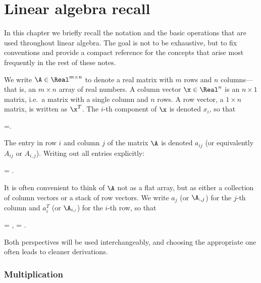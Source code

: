 
\chapter{Linear algebra recall}

In this chapter we briefly recall the notation and the basic operations that are used throughout linear algebra. The goal is not to be exhaustive, but to fix conventions and provide a compact reference for the concepts that arise most frequently in the rest of these notes.

We write $\A\in\Real^{m\times n}$ to denote a real matrix with $m$ rows and $n$ columns---that is, an $m\times n$ array of real numbers. A column vector $\x\in\Real^n$ is an $n\times 1$ matrix, i.e.\ a matrix with a single column and $n$ rows. A row vector, a $1\times n$ matrix, is written as $\x^T$. The $i$-th component of $\x$ is denoted $x_i$, so that
\begin{myequation}
\x=.
\end{myequation}
The entry in row $i$ and column $j$ of the matrix $\A$ is denoted $a_{ij}$ (or equivalently $A_{ij}$ or $A_{i,j}$). Writing out all entries explicitly:
\begin{myequation}
\A=
 .
\end{myequation}
It is often convenient to think of $\A$ not as a flat array, but as either a collection of column vectors or a stack of row vectors. We write $a_j$ (or $\A_{:,j}$) for the $j$-th column and $a_i^T$ (or $\A_{i,:}$) for the $i$-th row, so that
\begin{myequation}
\A=
\qquad{},
\qquad
\A=
\qquad{}.
\end{myequation}
Both perspectives will be used interchangeably, and choosing the appropriate one often leads to cleaner derivations.

\subsection*{Multiplication}

